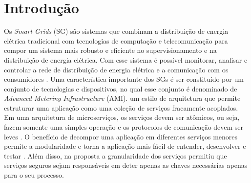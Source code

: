 \OnehalfSpacing
\chapter{Introdução}

Os \textit{Smart Grids} (SG) são sistemas que combinam a distribuição de energia elétrica tradicional com tecnologias de computação e telecomunicação para compor um sistema mais robusto e eficiente no supervisionamento e na distribuição de energia elétrica. Com esse sistema é possível monitorar, analisar e controlar a rede de distribuição de energia elétrica e a comunicação com os consumidores \cite{Barbosa2016}. Uma característica importante dos SGs é ser constituído por um conjunto de tecnologias e dispositivos, no qual esse conjunto é denominado de \textit{Advanced Metering Infrastructure} (AMI).  
um estilo de arquitetura que permite estruturar uma aplicação como uma coleção de serviços fracamente acoplados. Em uma arquitetura de microserviços, os serviços devem ser atômicos, ou seja, fazem somente uma simples operação e os protocolos de comunicação devem ser leves \cite{Hasselbring2016}. O benefício de decompor uma aplicação em diferentes serviços menores permite a modularidade e torna a aplicação mais fácil de entender, desenvolver e testar \cite{Richardson-Chris}. Além disso, na proposta a granularidade dos serviços permitiu que serviços seguros sejam responsáveis em deter apenas as chaves necessárias apenas para o seu processo. 




    

